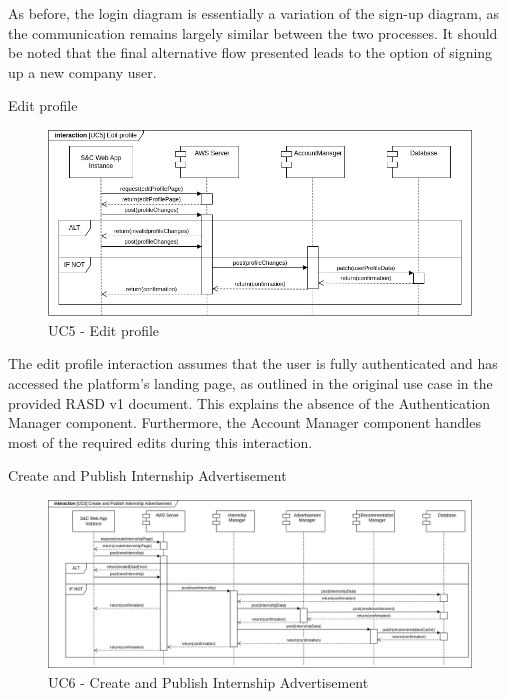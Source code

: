 \begin{enumerate}[label={[UC\arabic*]}]
    As before, the login diagram is essentially a variation of the sign-up diagram, as the communication remains largely similar between the two processes. It should be noted that the final alternative flow presented leads to the option of signing up a new company user.
    
    \item Edit profile
    \begin{figure}[h]
        \centering
        \includegraphics[width=1\linewidth]{DD-Latex//assets//Runtime View Diagrams/UC5.jpg}
        \caption{UC5 - Edit profile}
        \label{fig:UC5}
    \end{figure}

    The edit profile interaction assumes that the user is fully authenticated and has accessed the platform's landing page, as outlined in the original use case in the provided RASD v1 document. This explains the absence of the Authentication Manager component. Furthermore, the Account Manager component handles most of the required edits during this interaction.
    
    \item Create and Publish Internship Advertisement
    \begin{figure}[h]
        \centering
        \includegraphics[width=1\linewidth]{DD-Latex//assets//Runtime View Diagrams/UC6.jpg}
        \caption{UC6 - Create and Publish Internship Advertisement}
        \label{fig:UC6}
    \end{figure}


\end{enumerate}
